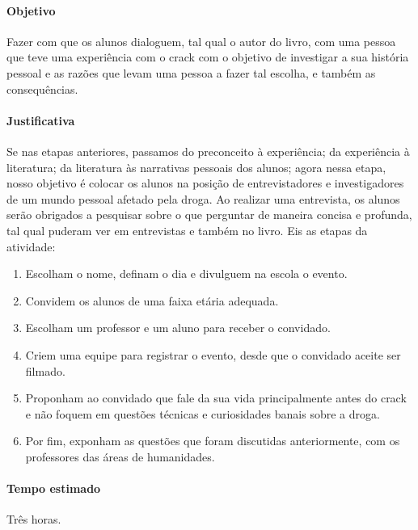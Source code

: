 \documentclass[12pt]{extarticle}
\begin{document}
\paragraph{Objetivo} Fazer  com que os alunos dialoguem, tal qual o autor do livro, 
	com uma pessoa que teve uma
	experiência com o crack com o objetivo de investigar a sua história pessoal 
	e as razões que levam uma pessoa a fazer tal escolha, e também as consequências. 

\paragraph{Justificativa} Se nas etapas anteriores, passamos do preconceito à experiência;
	da experiência à literatura; da literatura às narrativas pessoais dos alunos; agora
	nessa etapa, nosso objetivo é colocar os alunos na posição de entrevistadores
	e investigadores de um mundo pessoal afetado pela droga. Ao realizar uma entrevista, 
	os alunos serão obrigados a pesquisar sobre o que perguntar de maneira concisa e profunda, 
	tal qual puderam ver em entrevistas e também no livro. Eis as etapas da atividade:

\begin{enumerate}
	\paragraph{Metologia} 
	\item Escolham o nome, definam o dia e divulguem na escola o evento. 
	\item Convidem os alunos de uma faixa etária adequada. 
	\item Escolham um professor e um aluno para receber o convidado. 
	\item Criem uma equipe para registrar o evento, desde que o convidado
		aceite ser filmado. 
	\item Proponham ao convidado que fale da sua vida principalmente antes do crack e
		não foquem em questões técnicas e curiosidades banais sobre a droga. 
	\item Por fim, exponham as questões que foram discutidas anteriormente, 
		com os professores das áreas de humanidades. 
\end{enumerate}

\paragraph{Tempo estimado} Três horas.
\end{document}
